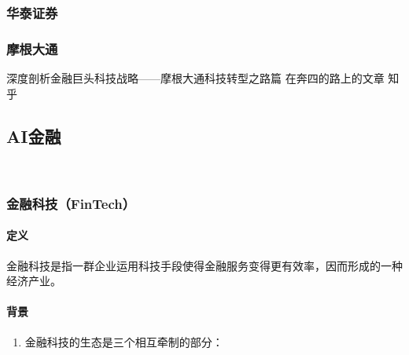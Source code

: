 \documentclass[letterpaper,11pt,english]{sphinxmanual}
\begin{document}
\begin{center}
{{\subsubsection{华泰证券}
\label{\detokenize{chapter_company/huatai:id1}}\label{\detokenize{chapter_company/huatai::doc}}


\subsubsection{摩根大通}
\label{\detokenize{chapter_company/JPMorgan:id1}}\label{\detokenize{chapter_company/JPMorgan::doc}}
深度剖析金融巨头科技战略——摩根大通科技转型之路篇 \sphinxhyphen{} 在奔四的路上的文章 \sphinxhyphen{}
知乎 


\subsection{AI金融}
\label{\detokenize{chapter_AI+Finance/index:ai}}\label{\detokenize{chapter_AI+Finance/index:chap-dive}}\label{\detokenize{chapter_AI+Finance/index::doc}}
​


\subsubsection{金融科技（FinTech）}
\label{\detokenize{chapter_AI+Finance/FinTech:fintech}}\label{\detokenize{chapter_AI+Finance/FinTech:id1}}\label{\detokenize{chapter_AI+Finance/FinTech::doc}}

\paragraph{定义}
\label{\detokenize{chapter_AI+Finance/FinTech:id2}}
金融科技是指一群企业运用科技手段使得金融服务变得更有效率，因而形成的一种经济产业。%
\begin{footnote}[948]\sphinxAtStartFootnote
{}
%
\end{footnote}


\paragraph{背景}
\label{\detokenize{chapter_AI+Finance/FinTech:id3}}\begin{enumerate}
%
\item {} 
金融科技的生态是三个相互牵制的部分：


\end{enumerate}}}
\end{center}
\end{document}
